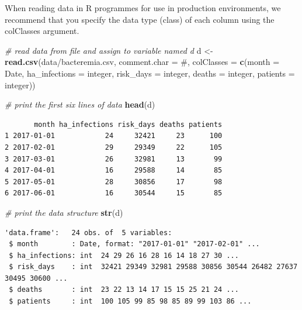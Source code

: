 \documentclass[
]{book}
\newenvironment{Shaded}{\begin{snugshade}}{\end{snugshade}}
\newcommand{\AttributeTok}[1]{\textcolor[rgb]{0.13,0.29,0.53}{#1}}
\newcommand{\CommentTok}[1]{\textcolor[rgb]{0.56,0.35,0.01}{\textit{#1}}}
\newcommand{\FunctionTok}[1]{\textcolor[rgb]{0.13,0.29,0.53}{\textbf{#1}}}
\newcommand{\NormalTok}[1]{#1}
\newcommand{\OtherTok}[1]{\textcolor[rgb]{0.56,0.35,0.01}{#1}}
\newcommand{\StringTok}[1]{\textcolor[rgb]{0.31,0.60,0.02}{#1}}
\begin{document}
When reading data in R programmes for use in production environments, we recommend that you specify the data type (class) of each column using the colClasses argument.

\begin{Shaded}
\begin{Highlighting}[]
\CommentTok{\# read data from file and assign to variable named d}
\NormalTok{d }\OtherTok{\textless{}{-}} \FunctionTok{read.csv}\NormalTok{(}\StringTok{\textquotesingle{}data/bacteremia.csv\textquotesingle{}}\NormalTok{,}
              \AttributeTok{comment.char =} \StringTok{\textquotesingle{}\#\textquotesingle{}}\NormalTok{,}
              \AttributeTok{colClasses   =} \FunctionTok{c}\NormalTok{(}\AttributeTok{month         =} \StringTok{\textquotesingle{}Date\textquotesingle{}}\NormalTok{,}
                               \AttributeTok{ha\_infections =} \StringTok{\textquotesingle{}integer\textquotesingle{}}\NormalTok{,}
                               \AttributeTok{risk\_days     =} \StringTok{\textquotesingle{}integer\textquotesingle{}}\NormalTok{,}
                               \AttributeTok{deaths        =} \StringTok{\textquotesingle{}integer\textquotesingle{}}\NormalTok{,}
                               \AttributeTok{patients      =} \StringTok{\textquotesingle{}integer\textquotesingle{}}\NormalTok{))}

\CommentTok{\# print the first six lines of data}
\FunctionTok{head}\NormalTok{(d)}
\end{Highlighting}
\end{Shaded}

\begin{verbatim}
       month ha_infections risk_days deaths patients
1 2017-01-01            24     32421     23      100
2 2017-02-01            29     29349     22      105
3 2017-03-01            26     32981     13       99
4 2017-04-01            16     29588     14       85
5 2017-05-01            28     30856     17       98
6 2017-06-01            16     30544     15       85
\end{verbatim}

\begin{Shaded}
\begin{Highlighting}[]
\CommentTok{\# print the data structure}
\FunctionTok{str}\NormalTok{(d)}
\end{Highlighting}
\end{Shaded}

\begin{verbatim}
'data.frame':   24 obs. of  5 variables:
 $ month        : Date, format: "2017-01-01" "2017-02-01" ...
 $ ha_infections: int  24 29 26 16 28 16 14 18 27 30 ...
 $ risk_days    : int  32421 29349 32981 29588 30856 30544 26482 27637 30495 30600 ...
 $ deaths       : int  23 22 13 14 17 15 15 25 21 24 ...
 $ patients     : int  100 105 99 85 98 85 89 99 103 86 ...
\end{verbatim}
\end{document}
